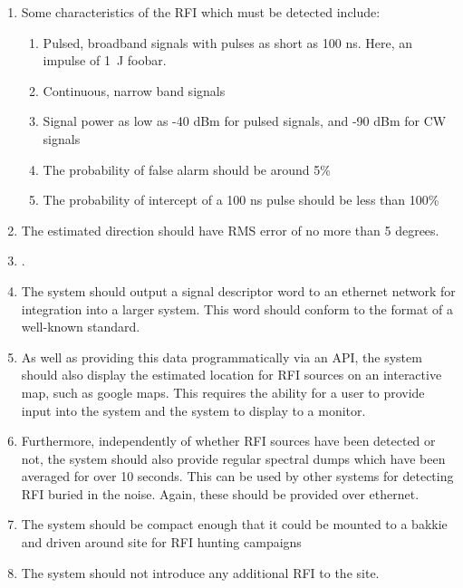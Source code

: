 \begin{enumerate}
  \item Some characteristics of the RFI which must be detected include:
  \begin{enumerate}
    \item Pulsed, broadband signals with pulses as short as 100 ns. Here, an impulse of \SI{1}{\joule} foobar.
    \item Continuous, narrow band signals
    \item Signal power as low as -40 dBm for pulsed signals, and -90 dBm for CW signals
    \item The probability of false alarm should be around 5\% 
    \item The probability of intercept of a 100 ns pulse should be less than 100\%
  \end{enumerate}

  \item The estimated direction should have RMS error of no more than 5 degrees.
    
  \item . 

  \item The system should output a signal descriptor word to an ethernet network for integration into a larger system.  This word should conform to the format of a well-known standard.

  \item As well as providing this data programmatically via an API, the system should also display the estimated location for RFI sources on an interactive map, such as google maps. This requires the ability for a user to provide input into the system and the system to display to a monitor. 

  \item Furthermore, independently of whether RFI sources have been detected or not, the system should also provide regular spectral dumps which have been averaged for over 10 seconds. This can be used by other systems for detecting RFI buried in the noise. Again, these should be provided over ethernet.

  \item The system should be compact enough that it could be mounted to a bakkie and driven around site for RFI hunting campaigns

  \item The system should not introduce any additional RFI to the site.
\end{enumerate}
